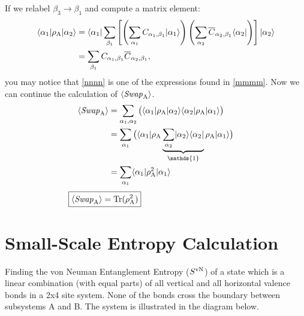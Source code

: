 If we relabel $\beta_3 \rightarrow \beta_1$ and compute a matrix element:
\begin{align}
	\langle {\alpha_1} \rvert\rho_{\rm A} \lvert {\alpha_2} \rangle
	&=   \langle {\alpha_1} \rvert\sum_{\beta_1}  \left[ \left(\sum_{\alpha_1} 
		C_{\alpha_1,\beta_1}\lvert {\alpha_1} \rangle\right)
		\left(\sum_{\alpha_2} 
		\overline{C}_{\alpha_2,\beta_1}\langle {\alpha_2} \rvert\right) \right] \lvert {\alpha_2} \rangle \\
	&= \sum_{\beta_1} C_{\alpha_1,\beta_1} \overline{C}_{\alpha_2,\beta_1} \label{nnnn},
\end{align}
you may notice that \eqref{nnnn} is one of the expressions found in \eqref{mmmm}.
Now we can continue the calculation of $\langle {\it Swap}_{\rm A} \rangle$.
\begin{align}
\langle \SWA \rangle &= \sum_{\alpha_1,\alpha_2} \big( \bra{\alpha_1}\rho_{\rm A} \ket{\alpha_2} 
					\bra{\alpha_2}\rho_{\rm A} \ket{\alpha_1}\big) \\
	&= \sum_{\alpha_1} \big( \bra{\alpha_1}\rho_{\rm A} 
				\underbrace{\sum_{\alpha_2} \ket{\alpha_2}\bra{\alpha_2}}_{\mathds{1}}
				\rho_{\rm A} \ket{\alpha_1}\big) \\
	&= \sum_{\alpha_1} \bra{\alpha_1}\rho_{\rm A}^2  \ket{\alpha_1}
\end{align}
\vspace{-5mm}
\begin{align}
	\hspace{-3.3cm}\boxed{\langle \SWA \rangle= {\rm Tr (\rho_A^2)}} \hspace{1cm}
\end{align}

\chapter{Small-Scale Entropy Calculation}
\label{small}
\newcommand{\ra}{\rangle}
\newcommand{\la}{\langle}
\newcommand{\ox}{\otimes}
\newcommand{\singlet}[2]{\left( \mid \up_#1 \dw_#2 \ra - \mid \dw_#1 \up_#2 \ra \right) }
\newcommand{\kb}[2]{\mid \! #1 \ra \la #2 \!\mid}

Finding the von Neuman Entanglement Entropy ($S^{\rm vN}$) of a state which is a linear combination (with equal parts) of all vertical and all horizontal valence bonds in a 2x4 site system.
None of the bonds cross the boundary between subsystems A and B.  
The system is illustrated in the diagram below.\\ 

